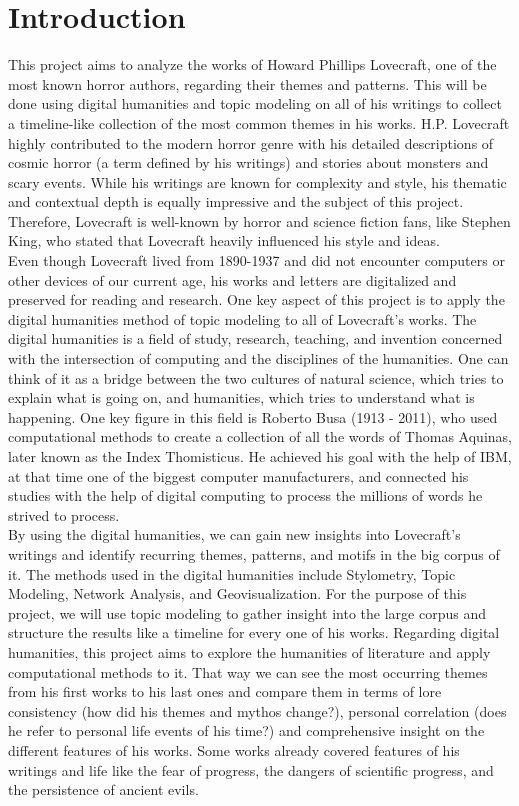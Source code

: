 \section{Introduction}

This project aims to analyze the works of Howard Phillips Lovecraft, one of the most known horror 
authors, regarding their themes and patterns. This will be done using digital humanities and topic 
modeling on all of his writings to collect a timeline-like collection of the most common themes in 
his works. H.P. Lovecraft highly contributed to the modern horror genre with his detailed descriptions 
of cosmic horror (a term defined by his writings) and stories about monsters and scary events. While 
his writings are known for complexity and style, his thematic and contextual depth is equally impressive 
and the subject of this project. Therefore, Lovecraft is well-known by horror and science fiction fans, 
like Stephen King, who stated that Lovecraft heavily influenced his style and ideas.\\

Even though Lovecraft lived from 1890-1937 and did not encounter computers or other devices of our 
current age, his works and letters are digitalized and preserved for reading and research. One key 
aspect of this project is to apply the digital humanities method of topic modeling to all of 
Lovecraft’s works. The digital humanities is a field of study, research, teaching, and invention 
concerned with the intersection of computing and the disciplines of the humanities. One can think 
of it as a bridge between the two cultures of natural science, which tries to explain what is going 
on, and humanities, which tries to understand what is happening. One key figure in this field is 
Roberto Busa (1913 - 2011), who used computational methods to create a collection of all the words 
of Thomas Aquinas, later known as the Index Thomisticus. He achieved his goal with the help of IBM, 
at that time one of the biggest computer manufacturers, and connected his studies with the help of 
digital computing to process the millions of words he strived to process.\\

By using the digital humanities, we can gain new insights into Lovecraft’s writings and identify 
recurring themes, patterns, and motifs in the big corpus of it. The methods used in the digital 
humanities include Stylometry, Topic Modeling, Network Analysis, and Geovisualization. For the 
purpose of this project, we will use topic modeling to gather insight into the large corpus and 
structure the results like a timeline for every one of his works. Regarding digital humanities, 
this project aims to explore the humanities of literature and apply computational methods to it. 
That way we can see the most occurring themes from his first works to his last ones and compare 
them in terms of lore consistency (how did his themes and mythos change?), personal correlation 
(does he refer to personal life events of his time?) and comprehensive insight on the different 
features of his works. Some works already covered features of his writings and life like the fear 
of progress, the dangers of scientific progress, and the persistence of ancient evils.
